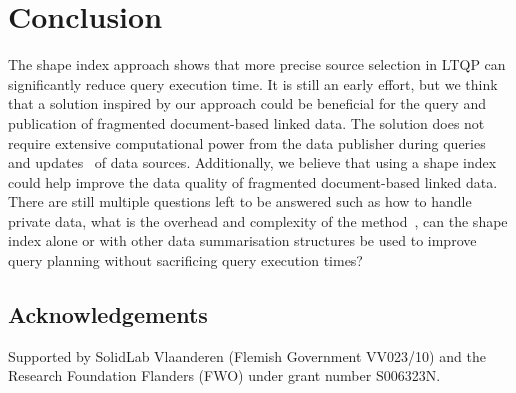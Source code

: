 \section{Conclusion}



The shape index approach shows that more precise source selection in LTQP can significantly reduce query execution time.
It is still an early effort, but we think that a solution inspired by our approach could be beneficial for the query and publication of fragmented document-based linked data.
The solution does not require extensive computational power from the data publisher during queries and updates~ of data sources.
Additionally, we believe that using a shape index could help improve the data quality of fragmented document-based linked data.
There are still multiple questions left to be answered such as how to handle private data, what is the overhead and complexity of the method~,
can the shape index alone or with other data summarisation structures be used to improve query planning without sacrificing query execution times?

\subsection*{Acknowledgements}
Supported by SolidLab Vlaanderen (Flemish Government VV023/10) and the Research Foundation Flanders (FWO) under grant number S006323N.

